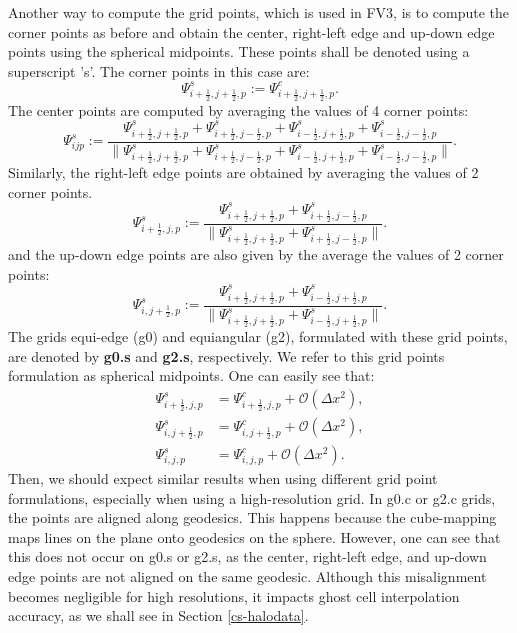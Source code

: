 Another way to compute the grid points, which is used in FV3, is to compute the corner
points as before and obtain the center, right-left edge and up-down edge points using the spherical midpoints.
These points shall be denoted using a superscript 's'.
The corner points in this case are:
\begin{equation}
	\Psi_{i+\frac{1}{2},j+\frac{1}{2},p}^s := \Psi_{i+\frac{1}{2},j+\frac{1}{2},p}^c.
\end{equation}
The center points are computed by averaging the values of 4 corner points:
\begin{equation}
	\Psi_{ijp}^s :=
	\frac{\Psi_{i+\frac{1}{2},j+\frac{1}{2},p}^s + \Psi_{i+\frac{1}{2},j-\frac{1}{2},p}^s + \Psi_{i-\frac{1}{2},j+\frac{1}{2},p}^s + \Psi_{i-\frac{1}{2},j-\frac{1}{2},p}^s}
         {\|\Psi_{i+\frac{1}{2},j+\frac{1}{2},p}^s + \Psi_{i+\frac{1}{2},j-\frac{1}{2},p}^s + \Psi_{i-\frac{1}{2},j+\frac{1}{2},p}^s + \Psi_{i-\frac{1}{2},j-\frac{1}{2},p}^s\|}.
\end{equation}
Similarly, the right-left edge points are obtained by averaging the values of 2 corner points.
\begin{equation}
	\Psi_{i+\frac{1}{2},j,p}^s :=
	\frac{\Psi_{i+\frac{1}{2},j+\frac{1}{2},p}^s + \Psi_{i+\frac{1}{2},j-\frac{1}{2},p}^s}
	   {\|\Psi_{i+\frac{1}{2},j+\frac{1}{2},p}^s + \Psi_{i+\frac{1}{2},j-\frac{1}{2},p}^s\|}.
\end{equation}
and the up-down edge points are also  given by the average  the values of 2 corner points:
\begin{equation}
	\Psi_{i,j+\frac{1}{2},p}^s :=
	\frac{\Psi_{i+\frac{1}{2},j+\frac{1}{2},p}^s + \Psi_{i-\frac{1}{2},j+\frac{1}{2},p}^s}
	     {\|\Psi_{i+\frac{1}{2},j+\frac{1}{2},p}^s + \Psi_{i-\frac{1}{2},j+\frac{1}{2},p}^s\|}.
\end{equation}
The grids equi-edge (g0) and equiangular (g2), formulated with these grid points, are denoted by \textbf{g0.s} and \textbf{g2.s}, respectively.
We refer to this grid points formulation as spherical midpoints.
One can easily see that:
\begin{align}
	\Psi_{i+\frac{1}{2},j,p}^s &= \Psi_{i+\frac{1}{2},j,p}^c+ \mathcal{O}(\Delta x^2),\\
	\Psi_{i,j+\frac{1}{2},p}^s &= \Psi_{i,j+\frac{1}{2},p}^c+ \mathcal{O}(\Delta x^2),\\
	\Psi_{i,j,p}^s &= \Psi_{i,j,p}^c + \mathcal{O}(\Delta x^2).
\end{align}
Then, we should expect similar results when using different grid point formulations, especially when using a high-resolution grid.
In g0.c or g2.c grids, the points are aligned along geodesics.
This happens because the cube-mapping maps lines on the plane onto geodesics on the sphere.
However, one can see that this does not occur on g0.s or g2.s, as the center, right-left edge, and up-down edge points are not aligned on the same geodesic.
Although this misalignment becomes negligible for high resolutions,
it impacts ghost cell interpolation accuracy, as we shall see in Section \ref{cs-halodata}.

